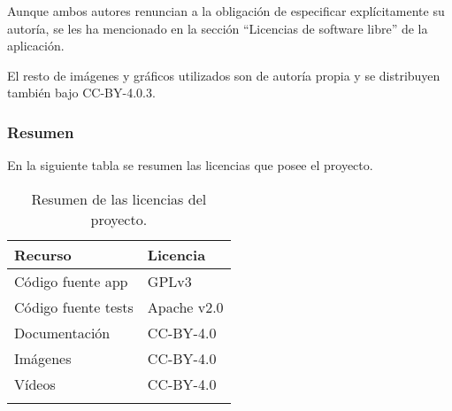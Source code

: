 Aunque ambos autores renuncian a la obligación de especificar
explícitamente su autoría, se les ha mencionado en la sección
``Licencias de software libre'' de la aplicación.

El resto de imágenes y gráficos utilizados son de autoría propia y se
distribuyen también bajo CC-BY-4.0.3.

\subsubsection{Resumen}\label{resumen-1}

En la siguiente tabla se resumen las licencias que posee el proyecto.

\begin{longtable}[]{@{}ll@{}}
\toprule
\begin{minipage}[b]{0.31\columnwidth}\raggedright\strut
Recurso\strut
\end{minipage} & \begin{minipage}[b]{0.21\columnwidth}\raggedright\strut
Licencia\strut
\end{minipage}\tabularnewline
\midrule
\endhead
\begin{minipage}[t]{0.31\columnwidth}\raggedright\strut
Código fuente app\strut
\end{minipage} & \begin{minipage}[t]{0.21\columnwidth}\raggedright\strut
GPLv3\strut
\end{minipage}\tabularnewline
\begin{minipage}[t]{0.31\columnwidth}\raggedright\strut
Código fuente tests\strut
\end{minipage} & \begin{minipage}[t]{0.21\columnwidth}\raggedright\strut
Apache v2.0\strut
\end{minipage}\tabularnewline
\begin{minipage}[t]{0.31\columnwidth}\raggedright\strut
Documentación\strut
\end{minipage} & \begin{minipage}[t]{0.21\columnwidth}\raggedright\strut
CC-BY-4.0\strut
\end{minipage}\tabularnewline
\begin{minipage}[t]{0.31\columnwidth}\raggedright\strut
Imágenes\strut
\end{minipage} & \begin{minipage}[t]{0.21\columnwidth}\raggedright\strut
CC-BY-4.0\strut
\end{minipage}\tabularnewline
\begin{minipage}[t]{0.31\columnwidth}\raggedright\strut
Vídeos\strut
\end{minipage} & \begin{minipage}[t]{0.21\columnwidth}\raggedright\strut
CC-BY-4.0\strut
\end{minipage}\tabularnewline
\bottomrule
\caption{Resumen de las licencias del proyecto.}
\end{longtable}
